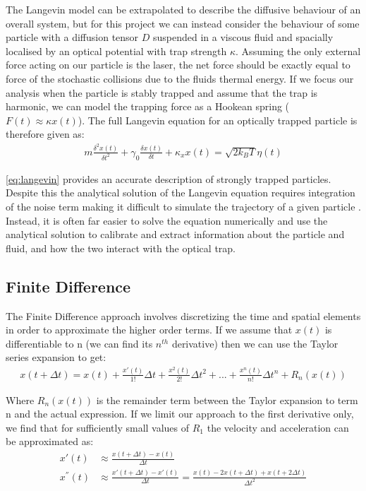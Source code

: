 The Langevin model can be extrapolated to describe the diffusive 
behaviour of an overall system, but for this project we can 
instead consider the behaviour of some particle with a diffusion 
tensor $D$ suspended in a viscous fluid and spacially localised 
by an optical potential with trap strength $\kappa$. Assuming the 
only external force acting on our particle is the laser, the net 
force should be exactly equal to force of the stochastic collisions 
due to the fluids thermal energy. If we focus our analysis when 
the particle is stably trapped and assume that the trap is harmonic, 
we can model the trapping force as a Hookean spring ($F(t) \approx 
\kappa x(t)$). The full Langevin equation for an optically trapped 
particle is therefore given as:
\begin{align}
	\label{eq:langevin}
	m\frac{\delta^2x(t)}{\delta t^2} + \gamma_0 \frac{\delta x(t)}{\delta t} + \kappa_x x(t) = \sqrt{2k_BT}\eta(t)
\end{align}

\eqref{eq:langevin} provides an accurate description of strongly 
trapped particles. Despite this the analytical solution of the 
Langevin equation requires integration of the noise term making 
it difficult to simulate the trajectory of a given particle 
\cite{Volpe2013}. Instead, it is often far easier to solve the 
equation numerically and use the analytical solution to calibrate 
and extract information about the particle and fluid, and how the 
two interact with the optical trap.

\subsection{Finite Difference}
The Finite Difference approach involves discretizing the time and 
spatial elements in order to approximate the higher order terms. 
If we assume that $x(t)$ is differentiable to n (we can find its 
$n^{th}$ derivative) then we can use the Taylor series expansion 
to get:
\begin{align}
	x(t+\Delta t) = x(t)+\frac{x'(t)}{1!}\Delta t + \frac{x^2(t)}{2!}\Delta t^2+...+\frac{x^n(t)}{n!}\Delta t^n+R_n(x(t))	
\end{align}

Where $R_n(x(t))$ is the remainder term between the Taylor 
expansion to term n and the actual expression. If we limit our 
approach to the first derivative only, we find that for 
sufficiently small values of $R_1$ the velocity and acceleration 
can be approximated as:
\begin{align}
	x'(t) &\approx \frac{x(t+\Delta t)-x(t)}{\Delta t}
	\\
	x^{''}(t) &\approx \frac{x'(t+\Delta t)-x'(t)}{\Delta t} = \frac{x(t)-2x(t+\Delta t)+x(t+2\Delta t)}{\Delta t^2}
\end{align}


